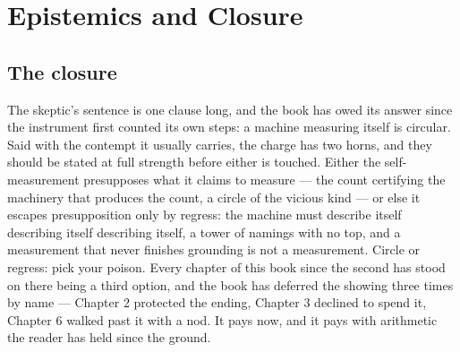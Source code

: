 \chapter{Epistemics and Closure}

\section{The closure}

The skeptic's sentence is one clause long, and the book has owed its answer since the
instrument first counted its own steps: a machine measuring itself is circular. Said
with the contempt it usually carries, the charge has two horns, and they should be
stated at full strength before either is touched. Either the self-measurement
presupposes what it claims to measure --- the count certifying the machinery that
produces the count, a circle of the vicious kind --- or else it escapes presupposition
only by regress: the machine must describe itself describing itself describing
itself, a tower of namings with no top, and a measurement that never finishes
grounding is not a measurement. Circle or regress: pick your poison. Every chapter of
this book since the second has stood on there being a third option, and the book has
deferred the showing three times by name --- Chapter 2 protected the ending, Chapter
3 declined to spend it, Chapter 6 walked past it with a nod. It pays now, and it pays
with arithmetic the reader has held since the ground.

